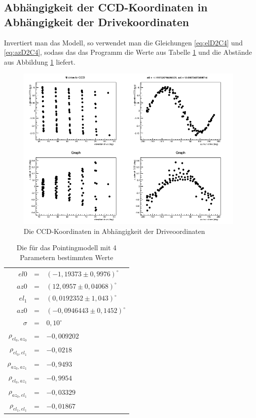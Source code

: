 \subsection{Abhängigkeit der CCD-Koordinaten in Abhängigkeit der Drivekoordinaten}
Invertiert man das Modell, so verwendet man die Gleichungen \ref{eq:elD2C4} und \ref{eq:azD2C4}, sodass das das Programm die Werte aus Tabelle \ref{tab:D2C4} und die Abstände aus Abbildung \ref{img:D2C4} liefert.
\begin{figure}[htbp]
\centering
\includegraphics[width=\textwidth]{../341/run341D2C4.png}
\caption{Die CCD-Koordinaten in Abhängigkeit der Driveoordinaten}
\label{img:D2C4}
\end{figure}
\begin{table}[htbp]
\centering
\begin{tabular}{rcl}
\toprule
$el0$ &=& $(-1,19373\pm 0,9976)^{\circ}$\\
$az0$ &=& $(12,0957\pm0,04068)^{\circ}$\\
$el_1$ &=& $(0,0192352\pm 1,043)^{\circ}$\\
$az0$ &=& $(-0,0946443\pm0,1452)^{\circ}$\\
$\sigma$ &=& $0,10^{\circ}$\\
$\rho_{el_0,az_0}$ &=& $-0,009202$\\
$\rho_{el_0,el_1}$ &=& $-0,0218$\\
$\rho_{az_0,az_1}$ &=& $-0,9493$\\
$\rho_{el_0,az_1}$ &=& $-0,9954$\\
$\rho_{az_0,el_1}$ &=& $-0,03329$\\
$\rho_{el_1,el_1}$ &=& $-0,01867$\\
\bottomrule
\end{tabular}
\label{tab:D2C4}
\caption{Die für das Pointingmodell mit 4 Parametern bestimmten Werte}
\end{table}

